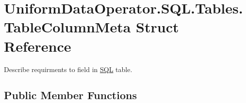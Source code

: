 \hypertarget{struct_uniform_data_operator_1_1_s_q_l_1_1_tables_1_1_table_column_meta}{}\section{Uniform\+Data\+Operator.\+S\+Q\+L.\+Tables.\+Table\+Column\+Meta Struct Reference}
\label{struct_uniform_data_operator_1_1_s_q_l_1_1_tables_1_1_table_column_meta}


Describe requirments to field in \mbox{\hyperlink{namespace_uniform_data_operator_1_1_s_q_l}{S\+QL}} table.  


\subsection*{Public Member Functions}
